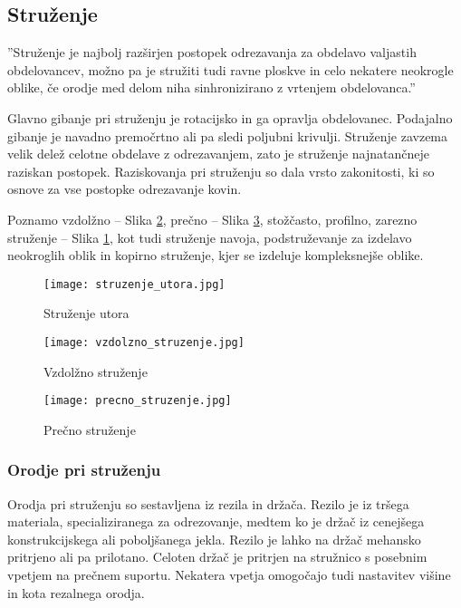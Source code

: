 \subsection{Struženje}
''Struženje je najbolj razširjen postopek odrezavanja za
obdelavo valjastih obdelovancev, možno pa je stružiti tudi ravne ploskve
in celo nekatere neokrogle oblike, če orodje med delom niha sinhronizirano
z vrtenjem obdelovanca.'' \cite{sts_arhiv_struzenje}

Glavno gibanje pri struženju je rotacijsko in ga opravlja
obdelovanec. Podajalno gibanje je navadno premočrtno ali pa
sledi poljubni krivulji. Struženje zavzema velik delež celotne
obdelave z odrezavanjem, zato je struženje najnatančneje
raziskan postopek. Raziskovanja pri struženju so dala vrsto
zakonitosti, ki so osnove za vse postopke odrezavanje kovin.

Poznamo vzdolžno -- Slika \ref{vzdolzno_struzenje},
prečno -- Slika \ref{precno_struzenje}, stožčasto, profilno,
zarezno struženje -- Slika \ref{struzenje_utora}, kot tudi
struženje navoja, podstruževanje za izdelavo neokroglih
oblik in kopirno struženje, kjer se izdeluje kompleksnejše oblike.

\begin{multicols}{3}
	\begin{figure}[H]
		\texttt{[image: struzenje\_utora.jpg]}
		\caption{Struženje utora
			\cite{sts_arhiv_struzenje}}
		\label{struzenje_utora}
	\end{figure}

	\columnbreak

	\begin{figure}[H]
		\texttt{[image: vzdolzno\_struzenje.jpg]}
		\caption{Vzdolžno struženje
			\cite{sts_arhiv_struzenje}}
		\label{vzdolzno_struzenje}
	\end{figure}

	\columnbreak

	\begin{figure}[H]
		\texttt{[image: precno\_struzenje.jpg]}
		\caption{Prečno struženje
			\cite{sts_arhiv_struzenje}}
		\label{precno_struzenje}
	\end{figure}
\end{multicols}

\subsubsection{Orodje pri struženju}
Orodja pri struženju so sestavljena iz rezila in držača. Rezilo je
iz tršega materiala, specializiranega za odrezovanje, medtem ko je
držač iz cenejšega konstrukcijskega ali poboljšanega jekla.
Rezilo je lahko na držač mehansko pritrjeno ali pa prilotano.
Celoten držač je pritrjen na stružnico s posebnim
vpetjem na prečnem suportu. Nekatera vpetja omogočajo tudi nastavitev
višine in kota rezalnega orodja.

